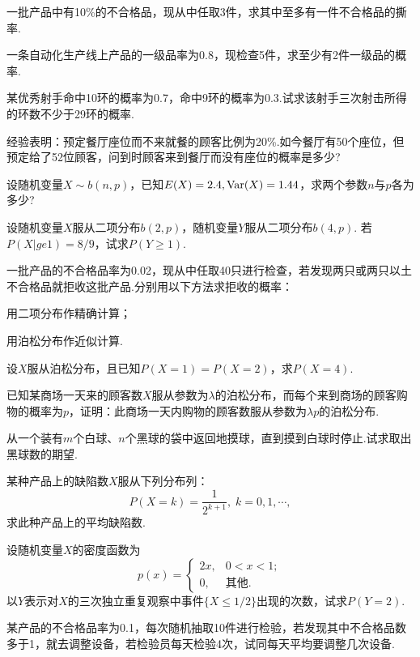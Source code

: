 \begin{xiti}
  \item 一批产品中有10\%的不合格品，现从中任取3件，求其中至多有一件不合格品的撕率.

  \item 一条自动化生产线上产品的一级品率为0.8，现检查5件，求至少有2件一级品的概率.

  \item 某优秀射手命中10环的概率为0.7，命中9环的概率为0.3.试求该射手三次射击所得的环数不少于29环的概率.

  \item 经验表明：预定餐厅座位而不来就餐的顾客比例为20\%.如今餐厅有50个座位，但预定给了52位顾客，问到时顾客来到餐厅而没有座位的概率是多少?

  \item 设随机变量$X\sim b(n,p)$，已知$E(X)=2.4,\operatorname{Var}(X)=1.44$，求两个参数$n$与$p$各为多少?

  \item 设随机变量$X$服从二项分布$b(2,p)$，随机变量$Y$服从二项分布$b(4,p)$. 若$P(X|ge1)=8/9$，试求$P(Y\ge1)$.

  \item 一批产品的不合格品率为0.02，现从中任取40只进行检查，若发现两只或两只以土不合格品就拒收这批产品.分别用以下方法求拒收的概率：\begin{inparaenum}[(1)]\item 用二项分布作精确计算；\item 用泊松分布作近似计算.
      \end{inparaenum}

  \item 设$X$服从泊松分布，且已知$P(X=1)=P(X=2)$，求$P(X=4)$.

  \item 已知某商场一天来的顾客数$X$服从参数为$\lambda$的泊松分布，而每个来到商场的顾客购物的概率为$p$，证明：此商场一天内购物的顾客数服从参数为$\lambda p$的泊松分布.

  \item 从一个装有$m$个白球、$n$个黑球的袋中返回地摸球，直到摸到白球时停止.试求取出黑球数的期望.

  \item 某种产品上的缺陷数$X$服从下列分布列：
  \[
    P(X = k) = \frac1{2^{k+1}},\; k = 0,1,\cdots,
  \]
  求此种产品上的平均缺陷数.

  \item 设随机变量$X$的密度函数为
  \[
    p(x) = \begin{cases}
      2x, & 0<x<1; \\
      0, & \text{其他}.
    \end{cases}
  \]
  以$Y$表示对$X$的三次独立重复观察中事件$\{X\le1/2\}$出现的次数，试求$P(Y=2)$.

  \item 某产品的不合格品率为0.1，每次随机抽取10件进行检验，若发现其中不合格品数多于1，就去调整设备，若检验员每天检验4次，试同每天平均要调整几次设备.
\end{xiti}

